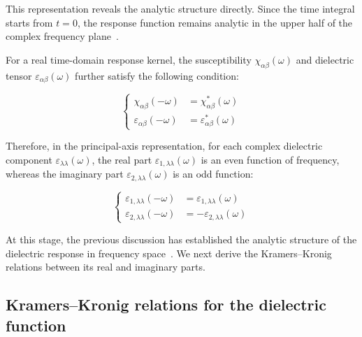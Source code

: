 This representation reveals the analytic structure directly.
Since the time integral starts from $t=0$, the response function remains analytic in the upper half of the complex frequency plane~\cite{nussenzveig1972causality}.

For a real time-domain response kernel, the susceptibility $\chi_{\alpha\beta}(\omega)$
and dielectric tensor $\varepsilon_{\alpha\beta}(\omega)$ further satisfy the following condition:

\begin{equation}
\left\{\begin{aligned}
    \chi_{\alpha\beta}(-\omega)
    &= \chi_{\alpha\beta}^{*}(\omega) \\
    \varepsilon_{\alpha\beta}(-\omega)
    &= \varepsilon_{\alpha\beta}^{*}(\omega)
\end{aligned}\right.
\label{reality_condition_response_functions}
\end{equation}

Therefore, in the principal-axis representation,
for each complex dielectric component $\varepsilon_{\lambda\lambda}(\omega)$,
the real part $\varepsilon_{1,\lambda\lambda}(\omega)$ is an even function of frequency,
whereas the imaginary part $\varepsilon_{2,\lambda\lambda}(\omega)$ is an odd function:

\begin{equation}
\left\{\begin{aligned}
    \varepsilon_{1,\lambda\lambda}(-\omega)
    &= \varepsilon_{1,\lambda\lambda}(\omega) \\
    \varepsilon_{2,\lambda\lambda}(-\omega)
    &= -\varepsilon_{2,\lambda\lambda}(\omega)
\end{aligned}\right.
\label{parity_of_dielectric_components}
\end{equation}

At this stage, the previous discussion has established the analytic structure of the dielectric response in frequency space~\cite{nussenzveig1972causality,franta2020symmetry,leon2026momentum}.
We next derive the Kramers--Kronig relations between its real and imaginary parts.

\subsection{Kramers--Kronig relations for the dielectric function}

